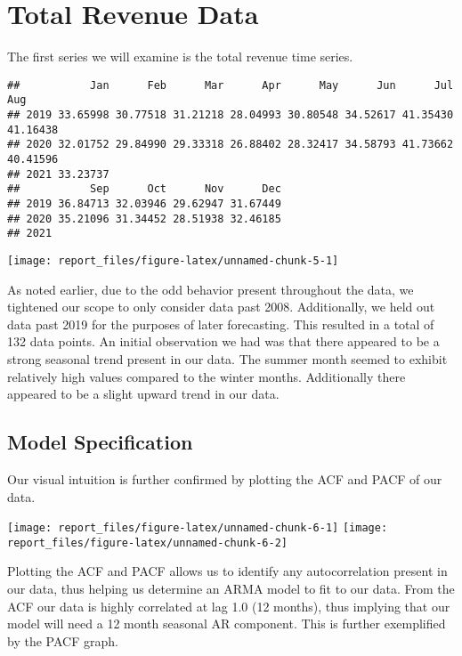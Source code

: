 \documentclass[
]{article}
\begin{document}
\section{Total Revenue Data}

The first series we will examine is the total revenue time series.

\begin{verbatim}
##           Jan      Feb      Mar      Apr      May      Jun      Jul      Aug
## 2019 33.65998 30.77518 31.21218 28.04993 30.80548 34.52617 41.35430 41.16438
## 2020 32.01752 29.84990 29.33318 26.88402 28.32417 34.58793 41.73662 40.41596
## 2021 33.23737                                                               
##           Sep      Oct      Nov      Dec
## 2019 36.84713 32.03946 29.62947 31.67449
## 2020 35.21096 31.34452 28.51938 32.46185
## 2021
\end{verbatim}

\begin{center}\texttt{[image: report\_files/figure-latex/unnamed-chunk-5-1]} \end{center}

As noted earlier, due to the odd behavior present throughout the data,
we tightened our scope to only consider data past 2008. Additionally, we
held out data past 2019 for the purposes of later forecasting. This
resulted in a total of 132 data points. An initial observation we had
was that there appeared to be a strong seasonal trend present in our
data. The summer month seemed to exhibit relatively high values compared
to the winter months. Additionally there appeared to be a slight upward
trend in our data.

\subsection{Model Specification}

Our visual intuition is further confirmed by plotting the ACF and PACF
of our data.

\begin{center}\texttt{[image: report\_files/figure-latex/unnamed-chunk-6-1]} \texttt{[image: report\_files/figure-latex/unnamed-chunk-6-2]} \end{center}

Plotting the ACF and PACF allows us to identify any autocorrelation
present in our data, thus helping us determine an ARMA model to fit to
our data. From the ACF our data is highly correlated at lag 1.0 (12
months), thus implying that our model will need a 12 month seasonal AR
component. This is further exemplified by the PACF graph.
\end{document}
